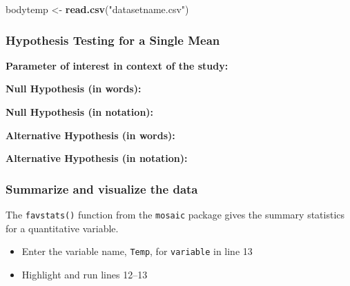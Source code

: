 \documentclass[
]{report}
\newenvironment{Shaded}{\begin{snugshade}}{\end{snugshade}}
\newcommand{\FunctionTok}[1]{\textcolor[rgb]{0.13,0.29,0.53}{\textbf{#1}}}
\newcommand{\NormalTok}[1]{#1}
\newcommand{\OtherTok}[1]{\textcolor[rgb]{0.56,0.35,0.01}{#1}}
\newcommand{\StringTok}[1]{\textcolor[rgb]{0.31,0.60,0.02}{#1}}
\begin{document}
\begin{Shaded}
\begin{Highlighting}[]
\NormalTok{bodytemp }\OtherTok{\textless{}{-}} \FunctionTok{read.csv}\NormalTok{(}\StringTok{"datasetname.csv"}\NormalTok{)}
\end{Highlighting}
\end{Shaded}

\newpage

\subsubsection*{Hypothesis Testing for a Single Mean}\label{hypothesis-testing-for-a-single-mean-1}

\textbf{Parameter of interest in context of the study:}

\vspace{0.8in}

\textbf{Null Hypothesis (in words):}

\vspace{0.8in}

\textbf{Null Hypothesis (in notation):}

\vspace{0.3in}

\textbf{Alternative Hypothesis (in words):}

\vspace{0.8in}

\textbf{Alternative Hypothesis (in notation):}

\vspace{0.3in}

\subsubsection*{Summarize and visualize the data}\label{summarize-and-visualize-the-data-1}

The \texttt{favstats()} function from the \texttt{mosaic} package gives the summary statistics for a quantitative variable.

\begin{itemize}
\item
  Enter the variable name, \texttt{Temp}, for \texttt{variable} in line 13
\item
  Highlight and run lines 12--13
\end{itemize}
\end{document}

